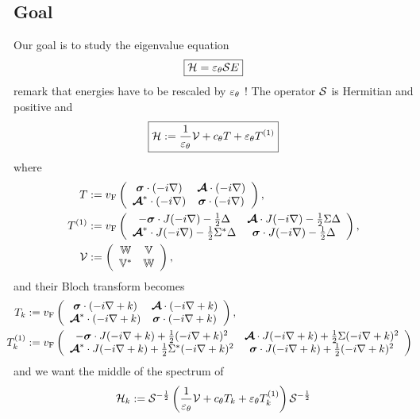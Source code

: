 \documentclass[11pt,a4paper,reqno,french,tikz]{amsart}
\newcommand{\pa}[1]{\left( #1 \right)} %
\let\p\relax\newcommand{\p}{\psi} %
\newcommand{\na}{\nabla} %
\newcommand{\f}[2]{\frac{#1}{#2}} %
\newcommand{\bbV}{\mathbb{V}}
\def\bbV{{\mathbb V}}
\def\bbW{{\mathbb W}}
\begin{document}
\subsection{Goal}%
\label{sub:goal}
Our goal is to study the eigenvalue equation
\begin{align*}
\boxed{\cH \p = \ep_\theta \cS E \p}
\end{align*}
remark that energies have to be rescaled by $\varepsilon_\theta$ ! The operator $\mathcal{S}$ is Hermitian and positive and
\begin{align*}
\boxed{\cH := \f{1}{\ep_\theta} \cV + c_\theta T + \ep_\theta T^{(1)}}
\end{align*}
where
\begin{align*}
T &:=  v_{\rm F} \left( \begin{array}{cc} \bm\sigma \cdot (-i \nabla)  &  \bm{\mathcal A} \cdot (-i\nabla)   \\  \bm{\mathcal A}^* \cdot (-i\nabla) &  \bm\sigma \cdot (-i \nabla)  \end{array} \right),  \\
T^{(1)} &:= v_{\rm F} \left( \begin{array}{cc}  -  \bm\sigma \cdot J (-i \nabla) - \frac 12  \Delta &  \bm{\mathcal A} \cdot J (-i\nabla) - \frac 12  \Sigma \Delta  \\  \bm{\mathcal A}^*  \cdot J (-i\nabla) - \frac 12 \Sigma^* \Delta &  \bm\sigma \cdot J (-i \nabla) - \frac 12   \Delta \end{array} \right), \\
\cV &:=  \left( \begin{array}{cc}  \bbW &   \bbV \\   \bbV^* &   \bbW \end{array} \right),
\end{align*}
and their Bloch transform becomes
\begin{align*}
T_k &:=  v_{\rm F} \left( \begin{array}{cc} \bm\sigma \cdot (-i\na +k)  &  \bm{\mathcal A} \cdot (-i\na +k)   \\  \bm{\mathcal A}^* \cdot (-i\na +k) &  \bm\sigma \cdot (-i\na +k)  \end{array} \right),  \\
\hspace{-5cm} T_k^{(1)} &:= v_{\rm F} \left( \begin{array}{cc}  -  \bm\sigma \cdot J (-i\na +k) +\f 12  (-i\na +k)^2 &  \bm{\mathcal A} \cdot J (-i\na +k) +\f 12  \Sigma (-i\na +k)^2  \\  \bm{\mathcal A}^*  \cdot J (-i\na +k) +\f 12 \Sigma^* (-i\na +k)^2 &  \bm\sigma \cdot J (-i\na +k) +\f 12   (-i\na +k)^2 \end{array} \right)
\end{align*}
and we want the middle of the spectrum of
\begin{align*}
\cH_k := \cS^{-\f 12} \pa{\f{1}{\ep_\theta} \cV + c_\theta T_k + \ep_\theta T^{(1)}_k}\cS^{-\f 12}
\end{align*}
\end{document}

